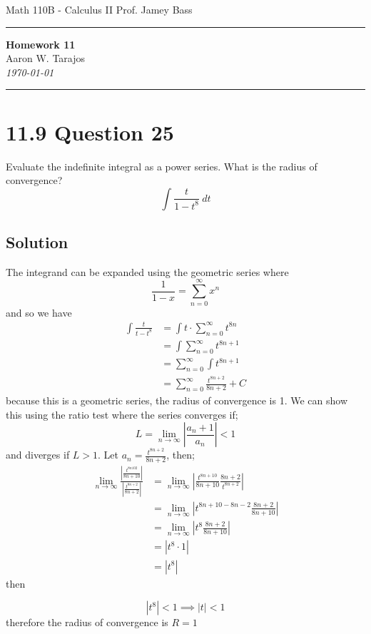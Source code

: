 \documentclass{article}
\begin{document}
\noindent
Math 110B - Calculus II  \hfill Prof. Jamey Bass

\noindent\rule{\textwidth}{0.4pt}

\begin{center}
    \textbf{\LARGE Homework 11} \\
    \vspace{12pt}
    \large Aaron W. Tarajos \\
    \textit{\today}
\end{center}

\noindent\rule{\textwidth}{0.4pt}

\section*{11.9 Question 25}
Evaluate the indefinite integral as a power series. What is the radius of convergence?
\[
	\int \frac{t}{1-t^8}\ dt
\]

\subsection{Solution}
The integrand can be expanded using the geometric series where
\begin{equation}
	\frac{1}{1-x} = \sum_{n=0}^\infty x^n
\end{equation}
and so we have
\begin{align*}
	\int \frac{t}{t-t^8} &= \int t \cdot \sum_{n=0}^\infty t^{8n} \\
			     &= \int \sum_{n=0}^\infty t^{8n+1} \\
			     &= \sum_{n=0}^\infty \int t^{8n+1} \\
			     &= \sum_{n=0}^\infty \frac{t^{8n+2}}{8n+2} + C
\end{align*}
because this is a geometric series, the radius of convergence is 1. We can show this using the ratio test where the series converges if;
\[
	L = \lim_{n \to \infty} \left| \frac{a_n +1}{a_n} \right| < 1
\]
and diverges if $L > 1$. Let $a_n = \frac{t^{8n+2}}{8n+2}$, then;
\begin{align*}
	\lim_{n \to \infty} \frac{\left|\frac{t^{8n102}}{8n+10}\right|}{\left| \frac{t^{8n+2}}{8n+2} \right|} &=\lim_{n \to \infty} \left|\frac{t^{8n+10}}{8n+10} \frac{8n+2}{t^{8n+2}}\right| \\
													      &= \lim_{n \to \infty} \left| t^{8n+10 - 8n - 2} \frac{8n+2}{8n+10}\right| \\
													      &=\lim_{n \to \infty} \left| t^8 \frac{8n+2}{8n+10}\right| \\
													      &= \left| t^8 \cdot 1\right| \\
													      &=\left| t^8 \right|
\end{align*}
then

\[
	\left| t^8 \right| < 1 \implies \left| t \right| < 1
\]
therefore the radius of convergence is $R=1$
\end{document}
